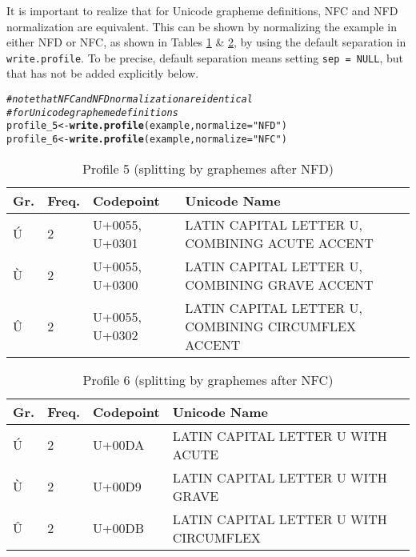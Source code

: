 \documentclass[output=book,nonflat,modfonts,
colorlinks, citecolor=brown,
		]{langsci/langscibook}\usepackage[]{graphicx}\usepackage[]{color}
\makeatletter
\newcommand{\hlstr}[1]{\textcolor[rgb]{0.192,0.494,0.8}{#1}}%
\newcommand{\hlcom}[1]{\textcolor[rgb]{0.678,0.584,0.686}{\textit{#1}}}%
\newcommand{\hlstd}[1]{\textcolor[rgb]{0.345,0.345,0.345}{#1}}%
\newcommand{\hlkwb}[1]{\textcolor[rgb]{0.69,0.353,0.396}{#1}}%
\newcommand{\hlkwc}[1]{\textcolor[rgb]{0.333,0.667,0.333}{#1}}%
\newcommand{\hlkwd}[1]{\textcolor[rgb]{0.737,0.353,0.396}{\textbf{#1}}}%
\newenvironment{kframe}{%
 \def\at@end@of@kframe{}%
 \ifinner\ifhmode%
  \def\at@end@of@kframe{\end{minipage}}%
  \begin{minipage}{\columnwidth}%
 \fi\fi%
 \def\FrameCommand##1{\hskip\@totalleftmargin \hskip-\fboxsep
 \colorbox{shadecolor}{##1}\hskip-\fboxsep
     \hskip-\linewidth \hskip-\@totalleftmargin \hskip\columnwidth}%
 \MakeFramed {\advance\hsize-\width
   \@totalleftmargin\z@ \linewidth\hsize
   \@setminipage}}%
 {\par\unskip\endMakeFramed%
 \at@end@of@kframe}
\newenvironment{knitrout}{}{} %
\makeatother
\begin{document}
It is important to realize that for Unicode grapheme definitions, NFC
and NFD normalization are equivalent. This can be shown by normalizing the
example in either NFD or NFC, as shown in Tables \ref{tab:profile5} \& \ref{tab:profile6}, 
by using the default separation in
\texttt{write.profile}. To be precise, default separation means setting
\texttt{sep~=~NULL}, but that has not be added explicitly below.

\begin{knitrout}\footnotesize
{}\color{fgcolor}\begin{kframe}
\begin{alltt}
\hlcom{# note that NFC and NFD normalization are identical}
\hlcom{# for Unicode grapheme definitions}
\hlstd{profile_5} \hlkwb{<-} \hlkwd{write.profile}\hlstd{(example,} \hlkwc{normalize} \hlstd{=} \hlstr{"NFD"}\hlstd{)}
\hlstd{profile_6} \hlkwb{<-} \hlkwd{write.profile}\hlstd{(example,} \hlkwc{normalize} \hlstd{=} \hlstr{"NFC"}\hlstd{)}
\end{alltt}
\end{kframe}
\end{knitrout}

\begin{table}[H]
\centering
\begingroup\scriptsize
\begin{tabular}{llll}
  \toprule
Gr. & Freq. & Codepoint & Unicode Name \\ 
  \midrule
Ú & 2 & U+0055, U+0301 & LATIN CAPITAL LETTER U, COMBINING ACUTE ACCENT \\ 
  Ù & 2 & U+0055, U+0300 & LATIN CAPITAL LETTER U, COMBINING GRAVE ACCENT \\ 
  Û & 2 & U+0055, U+0302 & LATIN CAPITAL LETTER U, COMBINING CIRCUMFLEX ACCENT \\ 
   \bottomrule
\end{tabular}
\endgroup
\caption{Profile 5 (splitting by graphemes after NFD)} 
\label{tab:profile5}
\end{table}


\begin{table}[H]
\centering
\begingroup\scriptsize
\begin{tabular}{llll}
  \toprule
Gr. & Freq. & Codepoint & Unicode Name \\ 
  \midrule
Ú & 2 & U+00DA & LATIN CAPITAL LETTER U WITH ACUTE \\ 
  Ù & 2 & U+00D9 & LATIN CAPITAL LETTER U WITH GRAVE \\ 
  Û & 2 & U+00DB & LATIN CAPITAL LETTER U WITH CIRCUMFLEX \\ 
   \bottomrule
\end{tabular}
\endgroup
\caption{Profile 6 (splitting by graphemes after NFC)} 
\label{tab:profile6}
\end{table}
\end{document}
